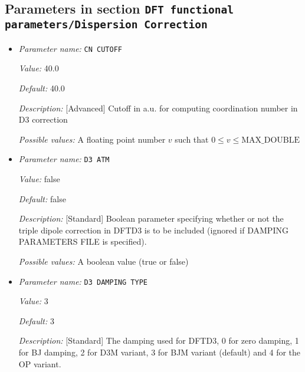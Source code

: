 


\subsection{Parameters in section \tt DFT functional parameters/Dispersion Correction}
\label{parameters:DFT_20functional_20parameters/Dispersion_20Correction}

\begin{itemize}
\item {\it Parameter name:} {\tt CN CUTOFF}
\label{parameters:DFT functional parameters/Dispersion Correction/CN CUTOFF}
\label{parameters:DFT_20functional_20parameters/Dispersion_20Correction/CN_20CUTOFF}


{\it Value:} 40.0


{\it Default:} 40.0


{\it Description:} [Advanced] Cutoff in a.u. for computing coordination number in D3 correction


{\it Possible values:} A floating point number $v$ such that $0 \leq v \leq \text{MAX\_DOUBLE}$
\item {\it Parameter name:} {\tt D3 ATM}
\label{parameters:DFT functional parameters/Dispersion Correction/D3 ATM}
\label{parameters:DFT_20functional_20parameters/Dispersion_20Correction/D3_20ATM}


{\it Value:} false


{\it Default:} false


{\it Description:} [Standard] Boolean parameter specifying whether or not the triple dipole correction in DFTD3 is to be included (ignored if DAMPING PARAMETERS FILE is specified).


{\it Possible values:} A boolean value (true or false)
\item {\it Parameter name:} {\tt D3 DAMPING TYPE}
\label{parameters:DFT functional parameters/Dispersion Correction/D3 DAMPING TYPE}
\label{parameters:DFT_20functional_20parameters/Dispersion_20Correction/D3_20DAMPING_20TYPE}


{\it Value:} 3


{\it Default:} 3


{\it Description:} [Standard] The damping used for DFTD3, 0 for zero damping, 1 for BJ damping, 2 for D3M variant, 3 for BJM variant (default) and 4 for the OP variant.



\end{itemize}
